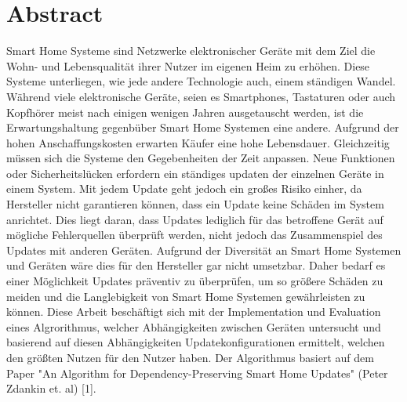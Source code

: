 \chapter*{Abstract}


Smart Home Systeme sind Netzwerke elektronischer Geräte mit dem Ziel die Wohn- und Lebensqualität
ihrer Nutzer im eigenen Heim zu erhöhen.
Diese Systeme unterliegen, wie jede andere Technologie auch, einem ständigen Wandel. Während viele elektronische 
Geräte, seien es Smartphones, Tastaturen oder auch Kopfhörer meist nach einigen wenigen Jahren ausgetauscht werden, ist die 
Erwartungshaltung gegenbüber Smart Home Systemen eine andere. Aufgrund der hohen Anschaffungskosten erwarten Käufer
eine hohe Lebensdauer. Gleichzeitig müssen sich die Systeme den Gegebenheiten der Zeit anpassen. Neue Funktionen oder
Sicherheitslücken erfordern ein ständiges updaten der einzelnen Geräte in einem System. Mit jedem Update geht jedoch ein großes Risiko 
einher, da Hersteller nicht garantieren können, dass ein Update keine Schäden im System anrichtet. Dies liegt daran, 
dass Updates lediglich für das betroffene Gerät auf 
mögliche Fehlerquellen überprüft werden, nicht jedoch das Zusammenspiel des Updates mit anderen Geräten. 
Aufgrund der Diversität an Smart Home Systemen und Geräten wäre dies für den Hersteller gar nicht umsetzbar.
Daher bedarf es einer Möglichkeit Updates präventiv zu überprüfen, um so größere Schäden zu meiden und 
die Langlebigkeit von Smart Home Systemen gewährleisten zu können.
Diese Arbeit beschäftigt sich mit der Implementation und Evaluation eines Algrorithmus, welcher 
Abhängigkeiten zwischen Geräten untersucht und basierend auf diesen Abhängigkeiten Updatekonfigurationen 
ermittelt, welchen den größten Nutzen für den Nutzer haben.
Der Algorithmus basiert auf dem Paper "An Algorithm for Dependency-Preserving 
Smart Home Updates" (Peter Zdankin et. al) [1].




